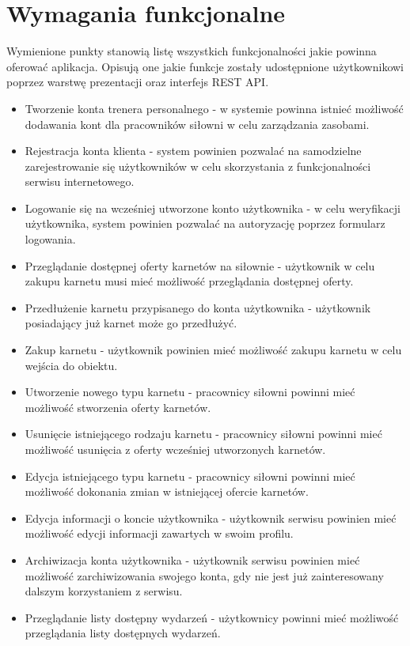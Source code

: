 \documentclass[a4paper,twoside,12pt]{book}
\begin{document}
	\section{Wymagania funkcjonalne} 
	Wymienione punkty stanowią listę wszystkich funkcjonalności jakie powinna oferować aplikacja. Opisują one jakie funkcje  zostały udostępnione użytkownikowi poprzez warstwę prezentacji oraz interfejs REST API.
		\begin{itemize}
			\item Tworzenie konta trenera personalnego - w systemie powinna istnieć możliwość dodawania kont dla pracowników siłowni w celu zarządzania zasobami.
			\item Rejestracja konta klienta - system powinien pozwalać na samodzielne zarejestrowanie się użytkowników w celu skorzystania z funkcjonalności serwisu internetowego.
			\item Logowanie się na wcześniej utworzone konto użytkownika - w celu weryfikacji użytkownika, system powinien pozwalać na autoryzację poprzez formularz logowania.
			\item Przeglądanie dostępnej oferty karnetów na siłownie - użytkownik w celu zakupu karnetu musi mieć możliwość przeglądania dostępnej oferty.
			\item Przedłużenie karnetu przypisanego do konta użytkownika - użytkownik posiadający już karnet może go przedłużyć.
			\item Zakup karnetu - użytkownik powinien mieć możliwość zakupu karnetu w celu wejścia do obiektu.
			\item Utworzenie nowego typu karnetu - pracownicy siłowni powinni mieć możliwość stworzenia oferty karnetów.
			\item Usunięcie istniejącego rodzaju karnetu - pracownicy siłowni powinni mieć możliwość usunięcia z oferty wcześniej utworzonych karnetów.
			\item Edycja istniejącego typu karnetu - pracownicy siłowni powinni mieć możliwość dokonania zmian w istniejącej ofercie karnetów.
			\item Edycja informacji o koncie użytkownika - użytkownik serwisu powinien mieć możliwość edycji informacji zawartych w swoim profilu.
			\item Archiwizacja konta użytkownika - użytkownik serwisu powinien mieć możliwość zarchiwizowania swojego konta, gdy nie jest już zainteresowany dalszym korzystaniem z serwisu.
			\item Przeglądanie listy dostępny wydarzeń - użytkownicy powinni mieć możliwość przeglądania listy dostępnych wydarzeń.

\end{itemize}
\end{document}
